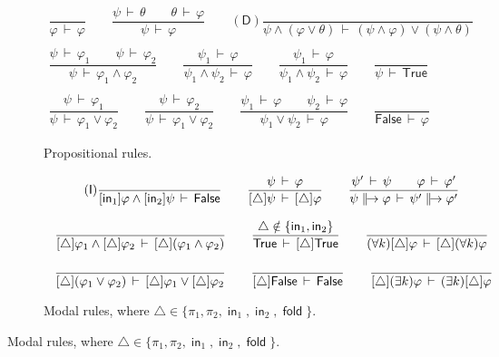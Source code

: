 \documentclass[%
  a4paper,
  UKenglish,
  cleveref,
  autoref,
  thm-restate,
  numberwithinsect,
]{lipics-v2021}
\newcommand\thesis{\vdash}
\newcommand\ax[1]{(\mathsf{#1})}
\newcommand\temp[1]{\mathsf{#1}}
\newcommand\True{\temp{True}}
\newcommand\False{\temp{False}}
\newcommand\term[1]{\mathsf{#1}}
\newcommand\inj{\mathop{\term{in}}}
\newcommand\fold{\mathop{\term{fold}}}
\newcommand\defrealto{\mathrel\parallel\joinrel\to}
\newcommand\realto{\mathrel{\defrealto}}
\newcommand\itvar{k}
\newcommand\form[1]{\lbrack #1 \rbrack}
\newcommand\modgen{\mathord{\triangle}}	%
\begin{document}
\begin{figure}[p!]
\begin{subfigure}{\textwidth}
\centering
\(
\begin{array}{c}
%
\dfrac{}
  {\varphi \,\thesis\, \varphi}
%
\qquad
%
\dfrac{\psi \,\thesis\, \theta
  \qquad
  \theta \,\thesis\, \varphi}
  {\psi \,\thesis\, \varphi}
%
\qquad
%
\ax{D}
\dfrac{}
  {\psi \land (\varphi \lor \theta)
  \,\thesis\,
  (\psi \land \varphi) \lor (\psi \land \theta)}
%
\\\\
%
\dfrac{\psi \,\thesis\, \varphi_1
  \qquad
  \psi \,\thesis\, \varphi_2}
  {\psi \,\thesis\, \varphi_1 \land \varphi_2}
%
\qquad
%
\dfrac{\psi_1 \,\thesis\, \varphi}
  {\psi_1 \land \psi_2 \,\thesis\, \varphi}
%
\qquad
%
\dfrac{\psi_1 \,\thesis\, \varphi}
  {\psi_1 \land \psi_2 \,\thesis\, \varphi}
%
\qquad
%
\dfrac{}
  {\psi \,\thesis\, \True}
%
\\\\
%
\dfrac{\psi \,\thesis\, \varphi_1}
  {\psi \,\thesis\, \varphi_1 \lor \varphi_2}
%
\qquad
%
\dfrac{\psi \,\thesis\, \varphi_2}
  {\psi \,\thesis\, \varphi_1 \lor \varphi_2}
%
\qquad
%
\dfrac{\psi_1 \,\thesis\, \varphi
  \qquad
  \psi_2 \,\thesis\, \varphi}
  {\psi_1 \lor \psi_2 \,\thesis\, \varphi}
%
\qquad
%
\dfrac{}
  {\False \,\thesis\, \varphi}
%
\end{array}
\)
\caption{Propositional rules.%
\label{fig:ded:prop}}
\end{subfigure}


\begin{subfigure}{\textwidth}
\centering
\(
\begin{array}{c}
%
\ax{I}
\dfrac{}
  {\form{\inj_1}\varphi \land \form{\inj_2}\psi \,\thesis\, \False}
%
\qquad
%
\dfrac{\psi \,\thesis\, \varphi}
  {\form\modgen \psi \,\thesis\, \form\modgen \varphi}
%
\qquad
%
\dfrac{\psi' \,\thesis\, \psi
  \qquad
  \varphi \,\thesis\, \varphi'}
  {\psi \realto \varphi
  \,\thesis\,
  \psi' \realto \varphi'}
%
\\\\
%
\dfrac{}
  {\form\modgen \varphi_1 \land \form\modgen \varphi_2
  \,\thesis\,
  \form\modgen(\varphi_1 \land \varphi_2)}
%
\qquad
%
\dfrac{\modgen \notin \{\inj_1,\inj_2\}}
  {\True \,\thesis\, \form{\modgen} \True}
%
\qquad
%
\dfrac{}
  {(\forall \itvar)\form{\modgen}\varphi
  \,\thesis\,
  \form{\modgen} (\forall \itvar)\varphi}
%
\\\\\
%
\dfrac{}
  {\form\modgen(\varphi_1 \lor \varphi_2)
  \,\thesis\,
  \form\modgen\varphi_1 \lor \form\modgen\varphi_2}
%
\qquad
%
\dfrac{}
  {\form\modgen \False \,\thesis\, \False}
%
\qquad
%
\dfrac{}
  {\form{\modgen} (\exists \itvar)\varphi
  \,\thesis\,
  (\exists \itvar)\form{\modgen}\varphi}
%
\end{array}
\)
\caption{Modal rules,
where $\modgen \in \{\pi_1, \pi_2, \inj_1, \inj_2, \fold\}$.%
\label{fig:ded:mod}}
\end{subfigure}



\end{figure}
\end{document}
